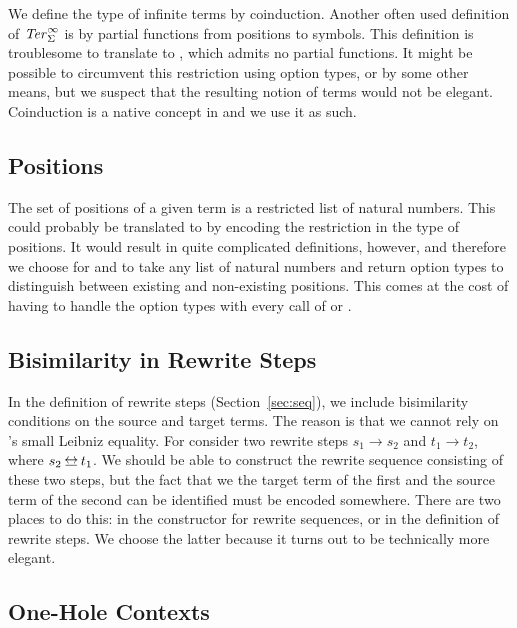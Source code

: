 We define the type of infinite terms by coinduction. Another often
used definition of $\mathit{Ter}_\Sigma^\infty$ is by partial functions from positions to
symbols. This definition is troublesome to translate to \Coq, which
admits no partial functions. It might be possible to circumvent this
restriction using option types, or by some other means, but we suspect
that the resulting notion of terms would not be elegant. Coinduction
is a native concept in \Coq and we use it as such.


\subsection{Positions}

The set of positions of a given term is a restricted list of natural
numbers. This could probably be translated to \Coq by encoding the
restriction in the type of positions. It would result in quite
complicated definitions, however, and therefore we choose for
 and
 to take any list of
natural numbers and return option types to distinguish between
existing and non-existing positions. This comes at the cost of having
to handle the option types with every call of
 or
.


\subsection{Bisimilarity in Rewrite Steps}

In the definition of rewrite steps (Section~\ref{sec:seq}), we include
bisimilarity conditions on the source and target terms. The reason is
that we cannot rely on \Coq's small Leibniz equality. For consider two
rewrite steps $s_1 \to s_2$ and $t_1 \to t_2$, where $s_2 \bis
t_1$. We should be able to construct the rewrite sequence consisting
of these two steps, but the fact that we the target term of the first
and the source term of the second can be identified must be encoded
somewhere. There are two places to do this: in the
 constructor
for rewrite sequences, or in the definition of rewrite steps. We
choose the latter because it turns out to be technically more
elegant.


\subsection{One-Hole Contexts}\label{sub:contexts}


